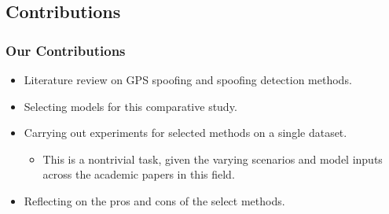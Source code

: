\documentclass[aspectratio=169, 8pt]{beamer}
\begin{document}
\subsection{Contributions}
\begin{frame}
\frametitle{Our Contributions}

\large
\begin{itemize}
    
    \item Literature review on GPS spoofing and spoofing detection methods.
    \item Selecting models for this comparative study.
    \item Carrying out experiments for selected methods on a single dataset.
    \begin{itemize}
        \item This is a nontrivial task, given the varying scenarios and model inputs across the academic papers in this field.
    \end{itemize}
    \item Reflecting on the pros and cons of the select methods.
\end{itemize}

\end{frame}






\end{document}

